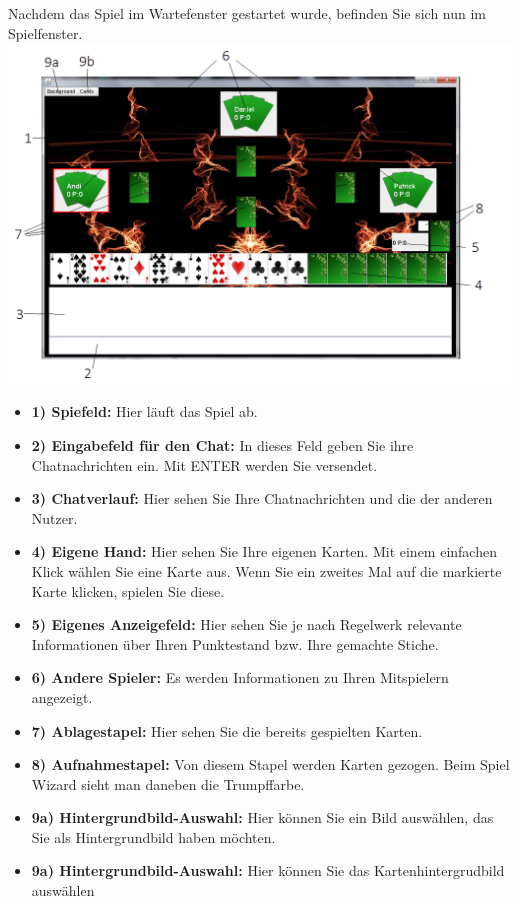 \documentclass[titlepage,10pt,a4paper]{article}
\begin{document}
Nachdem das Spiel im \gls{Wartefenster} gestartet wurde, befinden Sie sich nun im Spielfenster.\\
\includegraphics[width=\textwidth]{Spiel-Fenster}
\begin{itemize}
	\item \textbf{1) Spiefeld:} Hier läuft das Spiel ab.
	\item \textbf{2) Eingabefeld für den Chat:} In dieses Feld geben Sie ihre Chatnachrichten ein. Mit ENTER werden Sie versendet.
	\item \textbf{3) Chatverlauf:} Hier sehen Sie Ihre Chatnachrichten und die der anderen Nutzer.
	\item \textbf{4) Eigene Hand:} Hier sehen Sie Ihre eigenen Karten. Mit einem einfachen Klick wählen Sie eine Karte aus. Wenn Sie ein zweites Mal auf die markierte Karte klicken, spielen Sie diese.
	\item \textbf{5) Eigenes Anzeigefeld:} Hier sehen Sie je nach Regelwerk relevante Informationen über Ihren Punktestand bzw. Ihre gemachte Stiche.
	\item \textbf{6) Andere Spieler:} Es werden Informationen zu Ihren Mitspielern angezeigt.
	\item \textbf{7) Ablagestapel:} Hier sehen Sie die bereits gespielten Karten.
	\item \textbf{8) Aufnahmestapel:} Von diesem Stapel werden Karten gezogen. Beim Spiel Wizard sieht man daneben die Trumpffarbe.
	\item \textbf{9a) Hintergrundbild-Auswahl:} Hier können Sie ein Bild auswählen, das Sie als Hintergrundbild haben möchten.
	\item \textbf{9a) Hintergrundbild-Auswahl:} Hier können Sie das  Kartenhintergrudbild auswählen
\end{itemize}
\end{document}
